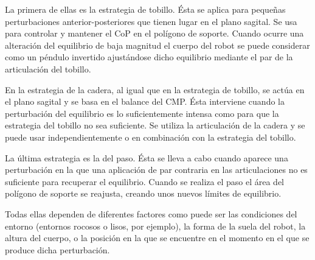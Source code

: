 La primera de ellas es la estrategia de tobillo. Ésta se aplica para pequeñas perturbaciones anterior-posteriores que tienen lugar en el plano sagital. Se usa para controlar y mantener el CoP en el polígono de soporte. Cuando ocurre una alteración del equilibrio de baja magnitud el cuerpo del robot se puede considerar como un péndulo invertido ajustándose dicho equilibrio mediante el par de la articulación del tobillo. 

En la estrategia de la cadera, al igual que en la estrategia de tobillo, se actúa en el plano sagital y se basa en el balance del CMP. Ésta interviene cuando la perturbación del equilibrio es lo suficientemente intensa como para que la estrategia del tobillo no sea suficiente. Se utiliza la articulación de la cadera y se puede usar independientemente o en combinación con la estrategia del tobillo. 

La última estrategia es la del paso. Ésta se lleva a cabo cuando aparece una perturbación en la que una aplicación de par contraria en las articulaciones no es suficiente para recuperar el equilibrio. Cuando se realiza el paso el área del polígono de soporte se reajusta, creando unos nuevos límites de equilibrio.

Todas ellas dependen de diferentes factores como puede ser las condiciones del entorno (entornos rocosos o lisos, por ejemplo), la forma de la suela del robot, la altura del cuerpo, o la posición en la que se encuentre en el momento en el que se produce dicha perturbación.


\afterpage{\null\newpage}
\newpage